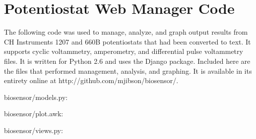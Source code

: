 \appendix
{}
\chapter{Potentiostat Web Manager Code}

The following code was used to manage, analyze, and graph output results from CH Instruments 1207 and 660B potentiostats that had been converted to text. It supports cyclic voltammetry, amperometry, and differential pulse voltammetry files. It is written for Python 2.6 and uses the Django package. Included here are the files that performed management, analysis, and graphing. It is available in its entirety online at http://github.com/mjibson/biosensor/. \newline

\normalsize biosensor/models.py:
\scriptsize 

\normalsize biosensor/plot.awk:
\scriptsize 

\normalsize biosensor/views.py:
\scriptsize 
